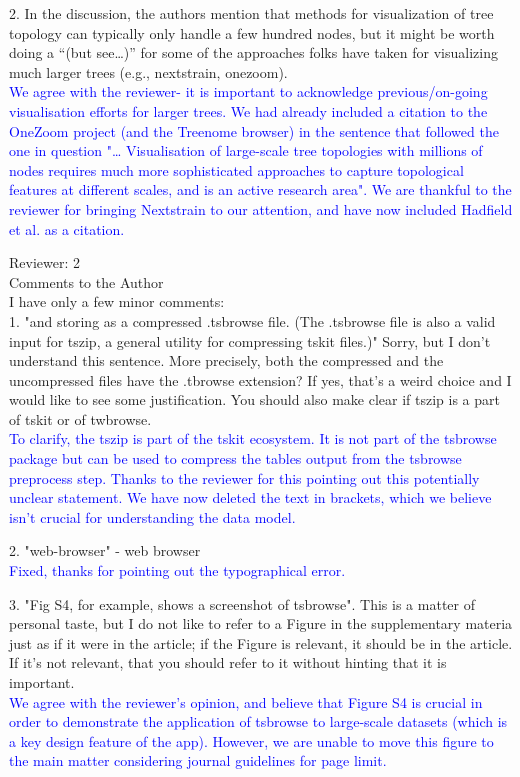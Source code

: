 \documentclass{letter}
\begin{document}
\begin{letter}{}
2. In the discussion, the authors mention that methods for visualization of tree topology can 
typically only handle a few hundred nodes, but it might be worth doing a “(but see…)” for some 
of the approaches folks have taken for visualizing much larger trees (e.g., nextstrain, onezoom).\\
\textcolor{blue}{We agree with the reviewer-  it is important to acknowledge previous/on-going visualisation efforts 
for larger trees. We had already included a citation to the OneZoom project (and the Treenome browser) in the 
sentence that followed the one in question "… Visualisation of large-scale tree topologies with millions of nodes 
requires much more sophisticated approaches to capture topological features at different scales, 
and is an active research area". We are thankful to the reviewer for bringing Nextstrain to our 
attention, and have now included Hadfield et al. as a citation.}

Reviewer: 2\\

Comments to the Author\\

I have only a few minor comments:\\
1. "and storing as a compressed .tsbrowse file. (The .tsbrowse file is also a valid input for
tszip, a general utility for compressing tskit files.)" Sorry, but I don't understand this sentence. 
More precisely, both the compressed and the uncompressed files have the .tbrowse extension? If yes, 
that's a weird choice and I would like to see some justification. You should also make clear if tszip 
is a part of tskit or of twbrowse.\\
\textcolor{blue}{To clarify, the tszip is part of the tskit ecosystem. It is not part of the tsbrowse 
package but can be used to compress the tables output from the tsbrowse preprocess step. Thanks to 
the reviewer for this pointing out this potentially unclear statement. We have now deleted the text 
in brackets, which we believe isn't crucial for understanding the data model.}

2. "web-browser" - web browser\\
\textcolor{blue}{Fixed, thanks for pointing out the typographical error.}

3. "Fig S4, for example, shows a screenshot of tsbrowse". This is a matter of personal taste, but I do
not like to refer to a Figure in the supplementary materia just as if it were in the article; if the 
Figure is relevant, it should be in the article. If it's not relevant, that you should refer to it without
hinting that it is important.\\
\textcolor{blue}{We agree with the reviewer's opinion, and believe that Figure S4 is crucial 
in order to demonstrate the application of tsbrowse to large-scale datasets (which is a key design 
feature of the app). However, we are unable to move this figure to the main matter considering journal 
guidelines for page limit.}


\end{letter}
\end{document}
